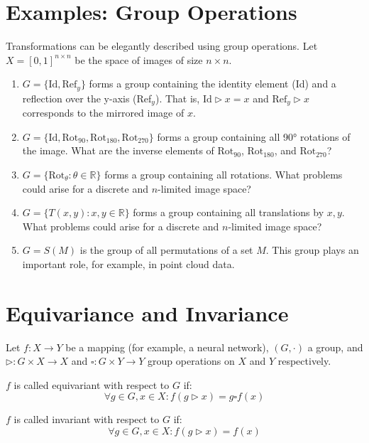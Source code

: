 \documentclass[a4paper]{article}
\begin{document}
\section*{Examples: Group Operations}

Transformations can be elegantly described using group operations. Let \( X = [0, 1]^{n \times n} \) be the space of images of size \( n \times n \).

\begin{enumerate}
    \item \( G = \{ \text{Id}, \text{Ref}_y \} \) forms a group containing the identity element (Id) and a reflection over the y-axis (Ref\(_y\)). That is, \(\text{Id} \triangleright x = x\) and \(\text{Ref}_y \triangleright x\) corresponds to the mirrored image of \( x \).
    \item \( G = \{ \text{Id}, \text{Rot}_{90}, \text{Rot}_{180}, \text{Rot}_{270} \} \) forms a group containing all 90° rotations of the image. What are the inverse elements of \(\text{Rot}_{90}\), \(\text{Rot}_{180}\), and \(\text{Rot}_{270}\)?
    \item \( G = \{ \text{Rot}_{\theta} : \theta \in \mathbb{R} \} \) forms a group containing all rotations. What problems could arise for a discrete and \( n \)-limited image space?
    \item \( G = \{ T(x, y) : x, y \in \mathbb{R} \} \) forms a group containing all translations by \( x, y \). What problems could arise for a discrete and \( n \)-limited image space?
    \item \( G = S(M) \) is the group of all permutations of a set \( M \). This group plays an important role, for example, in point cloud data.
\end{enumerate}

\section*{Equivariance and Invariance}

Let \( f : X \rightarrow Y \) be a mapping (for example, a neural network), \((G, \cdot)\) a group, and \(\triangleright : G \times X \rightarrow X\) and \(\square : G \times Y \rightarrow Y\) group operations on \( X \) and \( Y \) respectively.

\( f \) is called equivariant with respect to \( G \) if:
\[
\forall g \in G, x \in X : f(g \triangleright x) = g \square f(x)
\]

\( f \) is called invariant with respect to \( G \) if:
\[
\forall g \in G, x \in X : f(g \triangleright x) = f(x)
\]
\end{document}
